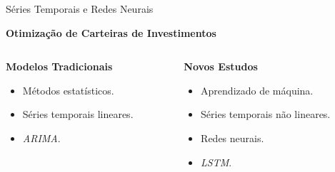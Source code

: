     \begin{frame}{Séries Temporais e Redes Neurais}

        \LARGE \textbf{Otimização de Carteiras de Investimentos}

        \vspace{1cm}


            \begin{columns}
                \begin{column}{0.5\textwidth}
                    
                    \LARGE \textbf{Modelos Tradicionais \cite{zhou2023twostage}}

                    \Large
                    \begin{itemize}
                        \item Métodos estatísticos.
                        \item Séries temporais lineares.
                        \item \textit{ARIMA}.
                    \end{itemize}
                    \vspace{11pt}

                \end{column}
                \begin{column}{0.5\textwidth}
                    \LARGE \textbf{Novos Estudos}

                    \Large
                    \begin{itemize}
                        \item Aprendizado de máquina.
                        \item Séries temporais não lineares.
                        \item Redes neurais.
                        \item \textit{LSTM}.
                    \end{itemize}
                            
                \end{column}
            \end{columns}
            


    \end{frame}
